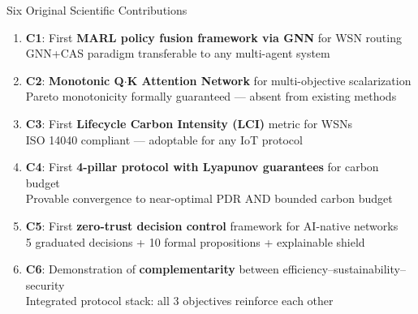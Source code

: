 \documentclass[10pt,aspectratio=169]{beamer}
\begin{document}
\begin{frame}{Six Original Scientific Contributions}
\begin{enumerate}\small
  \item \textbf{C1}: First \textbf{MARL policy fusion framework via GNN} for WSN routing\\
        {\footnotesize GNN+CAS paradigm transferable to any multi-agent system}

  \item \textbf{C2}: \textbf{Monotonic Q$\cdot$K Attention Network} for multi-objective scalarization\\
        {\footnotesize Pareto monotonicity formally guaranteed --- absent from existing methods}

  \item \textbf{C3}: First \textbf{Lifecycle Carbon Intensity (LCI)} metric for WSNs\\
        {\footnotesize ISO 14040 compliant --- adoptable for any IoT protocol}

  \item \textbf{C4}: First \textbf{4-pillar protocol with Lyapunov guarantees} for carbon budget\\
        {\footnotesize Provable convergence to near-optimal PDR AND bounded carbon budget}

  \item \textbf{C5}: First \textbf{zero-trust decision control} framework for AI-native networks\\
        {\footnotesize 5 graduated decisions + 10 formal propositions + explainable shield}

  \item \textbf{C6}: Demonstration of \textbf{complementarity} between efficiency--sustainability--security\\
        {\footnotesize Integrated protocol stack: all 3 objectives reinforce each other}
\end{enumerate}
\end{frame}
\end{document}
